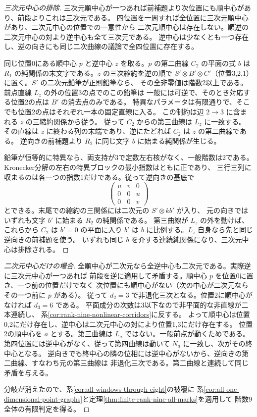 \begin{proof}[三次元中心の排除]
三次元順中心が一つあれば前補題より次位置にも順中心があり、前段よりこれは三次元である。
四位置を一周すれば全位置に三次元順中心があり、二次元中心の位置での一意性から
二次元順中心は存在しない。順逆の二次元中心の対より逆中心も全て三次元である。
逆中心は少なくとも一つ存在し、逆の向きにも同じ二次曲線の議論で全四位置に存在する。

同じ位置0にある順中心 $p$ と逆中心 $z$ を取る。$p$ の第二曲線 $C_2$ の平面の式 $b$
は $R_1$ の純関係の末文字である。$z$ の三次縮約を逆の順で
$S'\otimes B'\otimes C'$（位置3,2,1）に置く。$S'$ の二次元鉛筆が正則鉛筆なら、
その全非零値は階数2以上である。前点直線 $L_z$ の外の位置3の点でのこの鉛筆は
一般には可逆で、そのとき対応する位置2の点は $B'$ の消去点のみである。
特異なパラメータは有限通りで、そこでも位置2の点はそれぞれ一本の固定直線に入る。
この制約は辺 $2\to3$ に含まれる $z$ の三縮約関係から従う。
従って $C_2$ からの第三曲線は $L_z$ に一致する。
その直線は $z$ に終わる列の末端であり、逆にたどれば $C_2$ は $z$ の第二曲線である。
逆向きの前補題より $R_2$ に同じ文字 $b$ に始まる純関係が生じる。

鉛筆が恒等的に特異なら、両支持が3で定数左右核がなく、一般階数は2である。
Kronecker分解の左右の特異ブロックの最小指数はともに正であり、
三行三列に収まるのは各一つの指数1だけである。従って逆向きの基底で
\[
                \begin{pmatrix}u&v&0\\0&0&u\\0&0&v\end{pmatrix}
\]
とできる。末尾での縮約の三関係には二次元の $S'\otimes k b'$ が入り、
元の向きではいずれも文字 $b'$ に始まる $R_2$ の純関係である。
第三曲線が $L_z$ の外を動けば、これらから $C_2$ は $b'=0$ の平面に入り
$b'$ は $b$ に比例する。$L_z$ 自身なら先と同じ逆向きの前補題を使う。
いずれも同じ $b$ を介する連続純関係になり、三次元中心は排除される。
\end{proof}

\begin{proof}[二次元中心だけの場合]
全順中心が二次元なら全逆中心も二次元である。実際逆に三次元中心が一つあれば
前段を逆に適用して矛盾する。順中心 $p$ を位置0に置き、一つ前の位置だけでなく
次位置にも順中心がない（次の中心が二次元ならその一つ前に $p$ がある）。
従って $d_2=3$ で非退化三次となる。位置2に順中心がなければ $d_3=6$ である。
平面成分の次数は3以下なので非平面的な非直線が二本連続し、
系\ref{cor:rank-nine-nonlinear-corridors}に反する。
よって順中心は位置0,2にだけ存在し、逆中心は二次元中心の対により位置1,3にだけ存在する。
位置2の順中心を $a$ とする。第三曲線は $L_a$ ではない。一般前点が動くためである。
第四位置には逆中心がなく、従って第四曲線は動いて $N_a$ に一致し、次がその終中心となる。
逆向きでも終中心の隣の位相には逆中心がないから、逆向きの第二曲線、すなわち元の第三曲線は
非退化三次である。第二曲線と連続して同じ矛盾を与える。

分岐が消えたので、系\ref{cor:all-windows-through-eight}の被覆に
系\ref{cor:all-one-dimensional-point-graphs}と定理\ref{thm:finite-rank-nine-all-marks}を適用して
階数9全体の有限判定を得る。
\end{proof}
